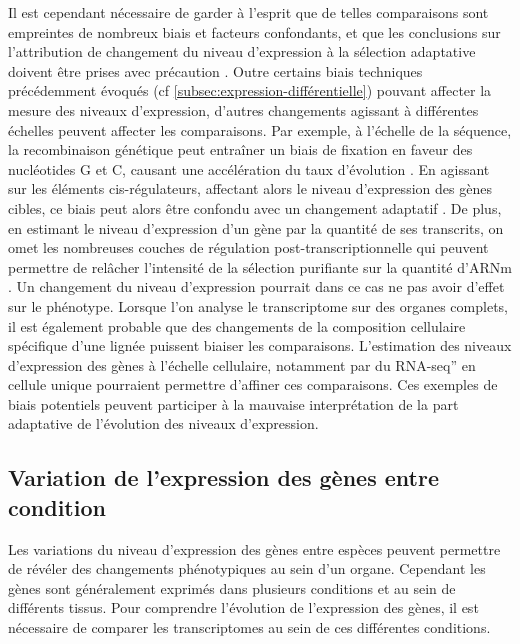 Il est cependant nécessaire de garder à l’esprit que de telles comparaisons sont empreintes de nombreux biais et facteurs confondants, et que les conclusions sur l’attribution de changement du niveau d’expression à la sélection adaptative doivent être prises avec précaution \citep{brawand_evolution_2011}. Outre certains biais techniques précédemment évoqués (cf \ref{subsec:expression-différentielle}) pouvant affecter la mesure des niveaux d’expression, d’autres changements agissant à différentes échelles peuvent affecter les comparaisons. Par exemple, à l’échelle de la séquence, la recombinaison génétique peut entraîner un biais de fixation en faveur des nucléotides G et C, causant une accélération du taux d’évolution \citep{duret_biased_2009}. En agissant sur les éléments \gls{cis}-régulateurs, affectant alors le niveau d’expression des gènes cibles, ce biais peut alors être confondu avec un changement adaptatif \citep{capra_many_2013, duret_comment_2009}. De plus, en estimant le niveau d’expression d’un gène par la quantité de ses transcrits, on omet les nombreuses couches de régulation post-transcriptionnelle qui peuvent permettre de relâcher l’intensité de la sélection purifiante sur la quantité d’\acrshort{ARNm} \citep{wang_transcriptome_2020}. Un changement du niveau d’expression pourrait dans ce cas ne pas avoir d’effet sur le phénotype. Lorsque l'on analyse le \gls{transcriptome} sur des organes complets, il est également probable que des changements de la composition cellulaire spécifique d’une lignée puissent biaiser les comparaisons. L’estimation des niveaux d’expression des gènes à l’échelle cellulaire, notamment par du \acrshort{RNA-seq}” en cellule unique pourraient permettre d’affiner ces comparaisons. Ces exemples de biais potentiels peuvent participer à la mauvaise interprétation de la part adaptative de l’évolution des niveaux d’expression.

\subsection{Variation de l’expression des gènes entre condition}
\label{sub:variation-condition}

Les variations du niveau d’expression des gènes entre espèces peuvent permettre de révéler des changements phénotypiques au sein d’un organe. Cependant les gènes sont généralement exprimés dans plusieurs \glspl{condition} et au sein de différents tissus. Pour comprendre l’évolution de l’expression des gènes, il est nécessaire de comparer les \glspl{transcriptome} au sein de ces différentes \glspl{condition}.

